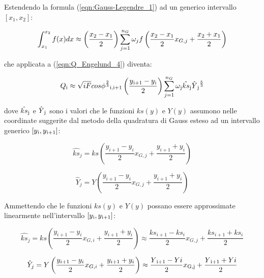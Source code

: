 \documentclass[12pt]{article} %
\begin{document}
\noindent Estendendo la formula (\ref{eqn:Gauss-Legendre_1}) ad un generico intervallo $[x_1,x_2]$:

\begin{equation}
    \int_{x_1}^{x_2} f(x)dx\approx\left(\frac{x\textsubscript{2}-x\textsubscript{1}}{2}\right)\sum_{j=1}^{n_G} \omega_j f\left(\frac{x\textsubscript{2}-x\textsubscript{1}}{2}x_{G,j}+\frac{x\textsubscript{2}+x\textsubscript{1}}{2}\right)
    \label{eqn:Gauss-Legendre_2}
\end{equation}

\noindent che applicata a (\ref{eqn:Q_Engelund_4}) diventa:

\begin{equation}
    Q\textsubscript{i}\approx\sqrt{iF}cos\phi^{\frac{2}{3}}\textsubscript{i,i+1}\left(\frac{y\textsubscript{i+1}-y\textsubscript{i}}{2}\right)\sum_{j=1}^{n_G} \omega\textsubscript{j}\hat{ks}\textsubscript{j}\hat{Y}\textsubscript{j}^{\frac{5}{3}}
    \label{eqn:Q_Gauss-Legendre_1}
\end{equation}

\noindent dove $\hat{ks}\textsubscript{j}$ e $\hat{Y}\textsubscript{j}$ sono i valori che le funzioni $ks(y)$ e $Y(y)$ assumono nelle coordinate suggerite dal metodo della quadratura di Gauss esteso ad un intervallo generico $[y\textsubscript{i}, y\textsubscript{i+1}]$: 

\begin{equation}
    \hat{ks}_{j}=ks\left(\frac{y_{i+1}-y_{i}}{2}x_{G,j}+\frac{y_{i+1}+y_{i}}{2}\right)
\end{equation}

\begin{equation}
    \hat{Y}_{j}=Y\left(\frac{y_{i+1}-y_{i}}{2}x_{G,j}+\frac{y_{i+1}+y_{i}}{2}\right)
\end{equation}

\noindent Ammettendo che le funzioni $ks(y)$ e $Y(y)$ possano essere approssimate linearmente nell’intervallo $[y\textsubscript{i}, y\textsubscript{i+1}]$:

\begin{equation}
    \hat{ks}_{j}=ks\left(\frac{y_{i+1}-y_{i}}{2}x_{G,i}+\frac{y_{i+1}+y_{i}}{2}\right)\approx\frac{ks_{i+1}-ks_{i}}{2}x_{G,j}+\frac{ks_{i+1}+ks_{i}}{2}
\end{equation}

\begin{equation}
    \hat{Y}_{j}=Y\left(\frac{y_{i+1}-y_{i}}{2}x_{G,i}+\frac{y_{i+1}+y_{i}}{2}\right)\approx\frac{Y\textsubscript{i+1}-Y{i}}{2}x\textsubscript{G,j}+\frac{Y\textsubscript{i+1}+Y{i}}{2}
\end{equation}
\end{document}
